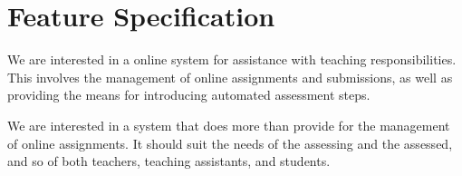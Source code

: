 
\chapter{Feature Specification}

We are interested in a online system for assistance with teaching
responsibilities. This involves the management of online assignments and
submissions, as well as providing the means for introducing automated
assessment steps.

 We are interested in a system that does more than provide for
the management of online assignments. It should suit the needs of the assessing
and the assessed, and so of both teachers, teaching assistants, and students.











